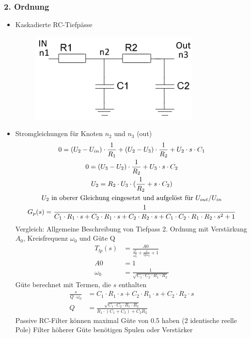 \subsubsection{2. Ordnung}
\begin{itemize}
  \item Kaskadierte RC-Tiefpässe\\
  \begin{figure}[htb]
  \includegraphics[scale=0.4]{pictures/tiefpass2ordnung}
  \end{figure}
  \item Stromgleichungen für Knoten $n_2$ und $n_3$ (out)
  \begin{gather*}
  0=(U_2-U_{in})\cdot \frac{1}{R_1}+(U_2-U_3)\cdot \frac{1}{R_2}+U_2\cdot s\cdot C_1\\
  0=(U_3-U_2)\cdot \frac{1}{R_2}+U_3\cdot s\cdot C_2\\
  U_2=R_2\cdot U_3\cdot (\frac{1}{R_2}+s\cdot C_2)\\
  \text{$U_2$ in oberer Gleichung eingesetzt und aufgelöst für
  $U_{out} /U_{in}$}\notag\\
  G_{p}(s)=\frac{1}{C_1\cdot R_1\cdot s+C_2\cdot R_1\cdot s+C_2\cdot R_2\cdot s+C_1\cdot C_2\cdot R_1\cdot R_2\cdot s^2+1}
  \end{gather*}
  Vergleich: Allgemeine Beschreibung von Tiefpass 2. Ordnung mit
  Verstärkung $A_0$, Kreisfrequenz $\omega_{0}$ und Güte Q
  \begin{align*}
  	T_{lp}(s)	&= \frac{A0}{\frac{s^2}{\omega_{0}^2}+\frac{s}{Q\omega_{0}}+1}\\
  	A0	 		&= 1 \\
  	\omega_{0}	&= \frac{1}{\sqrt{C_1\cdot C_2\cdot R_1\cdot R_2}}
  \end{align*}
  Güte berechnet mit Termen, die $s$ enthalten
  \begin{align*}
  	\frac{s}{Q\cdot \omega_{0}} &=C_1\cdot R_1\cdot s+C_2\cdot R_1\cdot s+C_2\cdot R_2\cdot s\\
  	Q 	&=\frac{\sqrt{C_1\cdot C_2\cdot R_1\cdot R_2}}{R_1\cdot (C_1+C_2)+C_2R_2}
  \end{align*}
  Passive RC-Filter können maximal Güte von 0.5 haben (2 identische reelle
  Pole) Filter höherer Güte benötigen Spulen oder Verstärker
\end{itemize}

